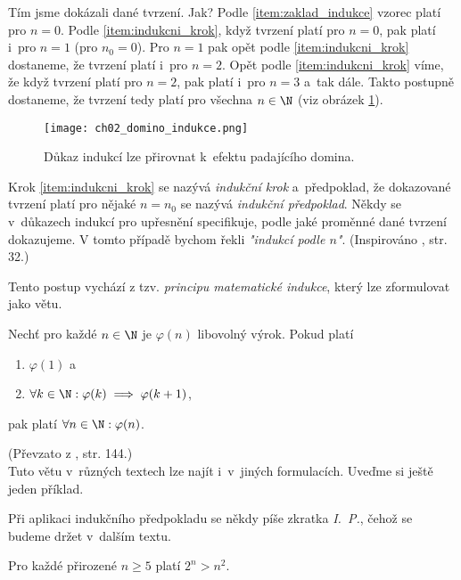 Tím jsme dokázali dané tvrzení. Jak? Podle \ref{item:zaklad_indukce} vzorec platí pro $n=0$. Podle \ref{item:indukcni_krok}, když tvrzení platí pro $n=0$, pak platí i~pro $n=1$ (pro $n_0=0$). Pro $n=1$ pak opět podle \ref{item:indukcni_krok} dostaneme, že tvrzení platí i~pro $n=2$. Opět podle \ref{item:indukcni_krok} víme, že když tvrzení platí pro $n=2$, pak platí i~pro $n=3$ a~tak dále. Takto postupně dostaneme, že tvrzení tedy platí pro všechna $n\in\N$ (viz obrázek \ref{fig:domino}).
\begin{figure}[H]
    \centering
    \texttt{[image: ch02\_domino\_indukce.png]}
    \caption{Důkaz indukcí lze přirovnat k~efektu padajícího domina.}
    \label{fig:domino}
\end{figure}
Krok \ref{item:indukcni_krok} se nazývá \emph{indukční krok} a~předpoklad, že dokazované tvrzení platí pro nějaké $n=n_0$ se nazývá \emph{indukční předpoklad}. Někdy se v~důkazech indukcí pro upřesnění specifikuje, podle jaké proměnné dané tvrzení dokazujeme. V tomto případě bychom řekli \emph{"indukcí podle $n$"}. (Inspirováno \cite{MatousekNesetril2009}, str. 32.)\par
Tento postup vychází z tzv. \emph{principu matematické indukce}, který lze zformulovat jako větu.
\begin{theorem}
    Nechť pro každé $n\in\N$ je $\varphi(n)$ libovolný výrok. Pokud platí
    \begin{enumerate}[label=(\roman*)]
        \item $\varphi(1)$ a
        \item $\forall k\in\N: \varphi(k) \implies \varphi(k+1)$,
    \end{enumerate}
    pak platí $\forall n\in\N: \varphi(n)$.
\end{theorem}
(Převzato z \cite{ChartrandPolimeniZhang2014}, str. 144.)\\
Tuto větu v~různých textech lze najít i~v~jiných formulacích. Uveďme si ještě jeden příklad.
\begin{convention}
    Při aplikaci indukčního předpokladu se někdy píše zkratka \emph{I.~P.}, čehož se budeme držet v~dalším textu.
\end{convention}
\begin{proposition}
    Pro každé přirozené $n\geq 5$ platí $2^n>n^2$.
\end{proposition}
